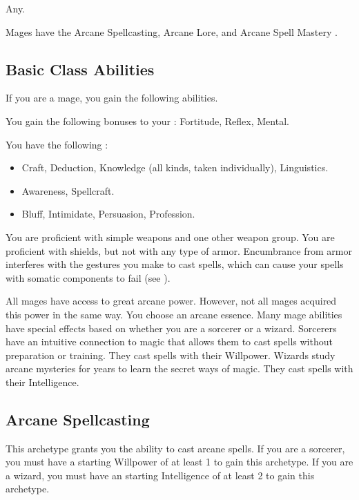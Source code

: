      Any.

     Mages have the Arcane Spellcasting, Arcane Lore, and Arcane Spell Mastery .

    \subsection{Basic Class Abilities}
        If you are a mage, you gain the following abilities.

        You gain the following bonuses to your :  Fortitude,  Reflex,  Mental.

        You have the following :
        \begin{itemize}
            \item {} Craft, Deduction, Knowledge (all kinds, taken individually), Linguistics.
            \item {} Awareness, Spellcraft.
            \item {} Bluff, Intimidate, Persuasion, Profession.
        \end{itemize}

        You are proficient with simple weapons and one other weapon group.
        You are proficient with shields, but not with any type of armor.
        Encumbrance from armor interferes with the gestures you make to cast spells, which can cause your spells with somatic components to fail (see ).

        All mages have access to great arcane power.
        However, not all mages acquired this power in the same way.
        You choose an arcane essence.
        Many mage abilities have special effects based on whether you are a sorcerer or a wizard.
         Sorcerers have an intuitive connection to magic that allows them to cast spells without preparation or training.
        They cast spells with their Willpower.
         Wizards study arcane mysteries for years to learn the secret ways of magic.
        They cast spells with their Intelligence.

    \subsection{Arcane Spellcasting}
        This archetype grants you the ability to cast arcane spells.
        If you are a sorcerer, you must have a starting Willpower of at least 1 to gain this archetype.
        If you are a wizard, you must have an starting Intelligence of at least 2 to gain this archetype.

